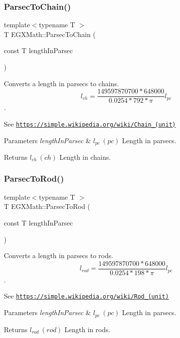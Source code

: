\subsubsection{\texorpdfstring{Parsec\+To\+Chain()}{ParsecToChain()}}
{\footnotesize\ttfamily template$<$typename T $>$ \\
T E\+G\+X\+Math\+::\+Parsec\+To\+Chain (\begin{DoxyParamCaption}\item[{const T}]{length\+In\+Parsec }\end{DoxyParamCaption})}



Converts a length in parsecs to chains. \[ l_{ch}= \frac{149597870700 * 648000}{0.0254 * 792 * \pi} l_{pc} \]. 

See \href{https://simple.wikipedia.org/wiki/Chain_(unit)}{\tt https\+://simple.\+wikipedia.\+org/wiki/\+Chain\+\_\+(unit)} 
\begin{DoxyParams}{Parameters}
{\em length\+In\+Parsec} & $ l_{pc}\ (pc)$ Length in parsecs. \\
\hline
\end{DoxyParams}
\begin{DoxyReturn}{Returns}
$ l_{ch}\ (ch)$ Length in chains. 
\end{DoxyReturn}
\mbox{\label{group___e_g_x_math-_conversions-_length_conversions-_astronomical-_parsec-_surveyors_gae1b8ed339937e1c769e4617dbe1e70e1}} 
\subsubsection{\texorpdfstring{Parsec\+To\+Rod()}{ParsecToRod()}}
{\footnotesize\ttfamily template$<$typename T $>$ \\
T E\+G\+X\+Math\+::\+Parsec\+To\+Rod (\begin{DoxyParamCaption}\item[{const T}]{length\+In\+Parsec }\end{DoxyParamCaption})}



Converts a length in parsecs to rods. \[ l_{rod}= \frac{149597870700 * 648000}{0.0254 * 198 * \pi} l_{pc} \]. 

See \href{https://simple.wikipedia.org/wiki/Rod_(unit)}{\tt https\+://simple.\+wikipedia.\+org/wiki/\+Rod\+\_\+(unit)} 
\begin{DoxyParams}{Parameters}
{\em length\+In\+Parsec} & $ l_{pc}\ (pc)$ Length in parsecs. \\
\hline
\end{DoxyParams}
\begin{DoxyReturn}{Returns}
$ l_{rod}\ (rod)$ Length in rods. 
\end{DoxyReturn}
